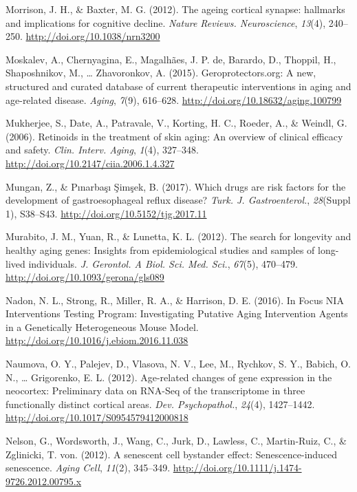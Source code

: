 \documentclass[12pt,twoside]{unicam}
\begin{document}
\begin{cslreferences}
\leavevmode\hypertarget{ref-Morrison2012}{}%
Morrison, J. H., \& Baxter, M. G. (2012). The ageing cortical synapse: hallmarks and implications for cognitive decline. \emph{Nature Reviews. Neuroscience}, \emph{13}(4), 240--250. \url{http://doi.org/10.1038/nrn3200}

\leavevmode\hypertarget{ref-Moskalev2015}{}%
Moskalev, A., Chernyagina, E., Magalhães, J. P. de, Barardo, D., Thoppil, H., Shaposhnikov, M., \ldots{} Zhavoronkov, A. (2015). Geroprotectors.org: A new, structured and curated database of current therapeutic interventions in aging and age-related disease. \emph{Aging}, \emph{7}(9), 616--628. \url{http://doi.org/10.18632/aging.100799}

\leavevmode\hypertarget{ref-Mukherjee2006}{}%
Mukherjee, S., Date, A., Patravale, V., Korting, H. C., Roeder, A., \& Weindl, G. (2006). Retinoids in the treatment of skin aging: An overview of clinical efficacy and safety. \emph{Clin. Interv. Aging}, \emph{1}(4), 327--348. \url{http://doi.org/10.2147/ciia.2006.1.4.327}

\leavevmode\hypertarget{ref-Mungan2017}{}%
Mungan, Z., \& Pınarbaşı Şimşek, B. (2017). Which drugs are risk factors for the development of gastroesophageal reflux disease? \emph{Turk. J. Gastroenterol.}, \emph{28}(Suppl 1), S38--S43. \url{http://doi.org/10.5152/tjg.2017.11}

\leavevmode\hypertarget{ref-Murabito2012}{}%
Murabito, J. M., Yuan, R., \& Lunetta, K. L. (2012). The search for longevity and healthy aging genes: Insights from epidemiological studies and samples of long-lived individuals. \emph{J. Gerontol. A Biol. Sci. Med. Sci.}, \emph{67}(5), 470--479. \url{http://doi.org/10.1093/gerona/gls089}

\leavevmode\hypertarget{ref-Nadon2016}{}%
Nadon, N. L., Strong, R., Miller, R. A., \& Harrison, D. E. (2016). In Focus NIA Interventions Testing Program: Investigating Putative Aging Intervention Agents in a Genetically Heterogeneous Mouse Model. \url{http://doi.org/10.1016/j.ebiom.2016.11.038}

\leavevmode\hypertarget{ref-Naumova2012}{}%
Naumova, O. Y., Palejev, D., Vlasova, N. V., Lee, M., Rychkov, S. Y., Babich, O. N., \ldots{} Grigorenko, E. L. (2012). Age-related changes of gene expression in the neocortex: Preliminary data on RNA-Seq of the transcriptome in three functionally distinct cortical areas. \emph{Dev. Psychopathol.}, \emph{24}(4), 1427--1442. \url{http://doi.org/10.1017/S0954579412000818}

\leavevmode\hypertarget{ref-Nelson2012}{}%
Nelson, G., Wordsworth, J., Wang, C., Jurk, D., Lawless, C., Martin-Ruiz, C., \& Zglinicki, T. von. (2012). A senescent cell bystander effect: Senescence-induced senescence. \emph{Aging Cell}, \emph{11}(2), 345--349. \url{http://doi.org/10.1111/j.1474-9726.2012.00795.x}


\end{cslreferences}
\end{document}
